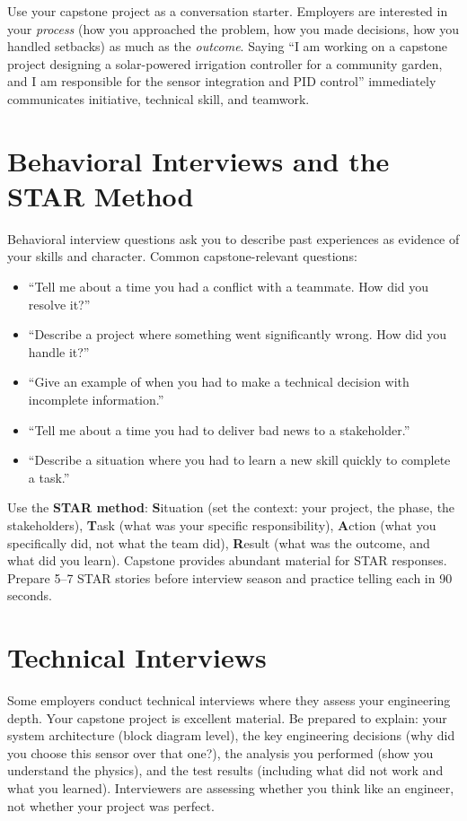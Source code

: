 Use your capstone project as a conversation starter. Employers are interested in your \emph{process} (how you approached the problem, how you made decisions, how you handled setbacks) as much as the \emph{outcome}. Saying ``I am working on a capstone project designing a solar-powered irrigation controller for a community garden, and I am responsible for the sensor integration and PID control'' immediately communicates initiative, technical skill, and teamwork.

\section{Behavioral Interviews and the STAR Method}
Behavioral interview questions ask you to describe past experiences as evidence of your skills and character. Common capstone-relevant questions:

\begin{itemize}[nosep,leftmargin=1.5em]
\item ``Tell me about a time you had a conflict with a teammate. How did you resolve it?''
\item ``Describe a project where something went significantly wrong. How did you handle it?''
\item ``Give an example of when you had to make a technical decision with incomplete information.''
\item ``Tell me about a time you had to deliver bad news to a stakeholder.''
\item ``Describe a situation where you had to learn a new skill quickly to complete a task.''
\end{itemize}

Use the \textbf{STAR method}: \textbf{S}ituation (set the context: your project, the phase, the stakeholders), \textbf{T}ask (what was your specific responsibility), \textbf{A}ction (what you specifically did, not what the team did), \textbf{R}esult (what was the outcome, and what did you learn). Capstone provides abundant material for STAR responses. Prepare 5--7 STAR stories before interview season and practice telling each in 90 seconds.

\section{Technical Interviews}
Some employers conduct technical interviews where they assess your engineering depth. Your capstone project is excellent material. Be prepared to explain: your system architecture (block diagram level), the key engineering decisions (why did you choose this sensor over that one?), the analysis you performed (show you understand the physics), and the test results (including what did not work and what you learned). Interviewers are assessing whether you think like an engineer, not whether your project was perfect.


